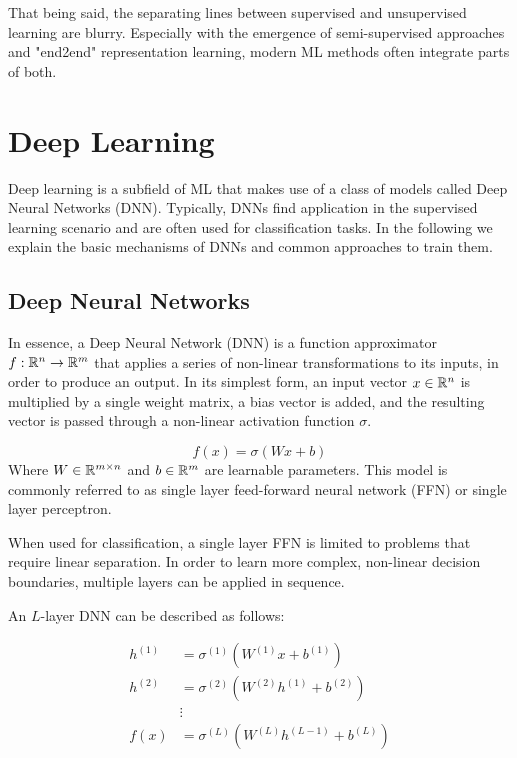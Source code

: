 That being said, the separating lines between supervised and unsupervised learning are blurry. Especially with the emergence of semi-supervised approaches and "end2end" representation learning, modern ML methods often integrate parts of both.

\section{Deep Learning}
\label{sec:dl}
Deep learning is a subfield of ML that makes use of a class of models called Deep Neural Networks (DNN). Typically, DNNs find application in the supervised learning scenario and are often used for classification tasks. In the following we explain the basic mechanisms of DNNs and common approaches to train them.

\subsection{Deep Neural Networks}
In essence, a Deep Neural Network (DNN) is a function approximator $f: \mathbb{R}^n \rightarrow \mathbb{R}^m$ that applies a series of non-linear transformations to its inputs, in order to produce an output. In its simplest form, an input vector $x \in \mathbb{R}^n$ is multiplied by a single weight matrix, a bias vector is added, and the resulting vector is passed through a non-linear activation function $\sigma$.

\begin{equation}
    f(x) = \sigma(W x + b)
\end{equation}
Where $W \in \mathbb{R}^{m \times n}$ and $b \in \mathbb{R}^{m}$ are learnable parameters.
This model is commonly referred to as single layer feed-forward neural network (FFN) or single layer perceptron.

When used for classification, a single layer FFN is limited to problems that require linear separation. In order to learn more complex, non-linear decision boundaries, multiple layers can be applied in sequence.

An $L$-layer DNN can be described as follows:

\begin{equation}
    \label{eq:DNN}
    \begin{split}
        h^{(1)} &= \sigma^{(1)}(W^{(1)} x + b^{(1)}) \\
        h^{(2)} &= \sigma^{(2)}(W^{(2)} h^{(1)} + b^{(2)}) \\
        & \vdots \\
        f(x) &= \sigma^{(L)}(W^{(L)} h^{(L-1)} + b^{(L)})
    \end{split}
\end{equation}

